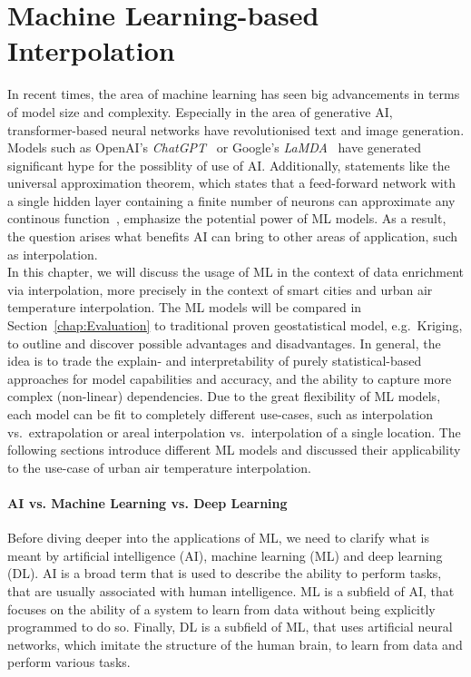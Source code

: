 \chapter{Machine Learning-based Interpolation}
\label{chap:Machine Learning based Interpolation}

In recent times, the area of machine learning has seen big advancements in terms of model size and complexity. Especially in the area of generative AI, transformer-based neural networks have revolutionised text and image generation. Models such as OpenAI's \textit{ChatGPT}~\cite{openai2023gpt4} or Google's \textit{LaMDA}~\cite{thoppilan2022lamda} have generated significant hype for the possiblity of use of AI\@. Additionally, statements like the universal approximation theorem, which states that a feed-forward network with a single hidden layer containing a finite number of neurons can approximate any continous function~\cite{hornik1989multilayer}, emphasize the potential power of ML models. As a result, the question arises what benefits AI can bring to other areas of application, such as interpolation.\\
In this chapter, we will discuss the usage of ML in the context of data enrichment via interpolation, more precisely in the context of smart cities and urban air temperature interpolation. The ML models will be compared in Section~\ref{chap:Evaluation} to traditional proven geostatistical model, e.g.\ Kriging, to outline and discover possible advantages and disadvantages. In general, the idea is to trade the explain- and interpretability of purely statistical-based approaches for model capabilities and accuracy, and the ability to capture more complex (non-linear) dependencies.
Due to the great flexibility of ML models, each model can be fit to completely different use-cases, such as interpolation vs.\ extrapolation or areal interpolation vs.\ interpolation of a single location. The following sections introduce different ML models and discussed their applicability to the use-case of urban air temperature interpolation.

\subsubsection{AI vs. Machine Learning vs. Deep Learning}

Before diving deeper into the applications of ML, we need to clarify what is meant by artificial intelligence (AI), machine learning (ML) and deep learning (DL). AI is a broad term that is used to describe the ability to perform tasks, that are usually associated with human intelligence. ML is a subfield of AI, that focuses on the ability of a system to learn from data without being explicitly programmed to do so. Finally, DL is a subfield of ML, that uses artificial neural networks, which imitate the structure of the human brain, to learn from data and perform various tasks.

